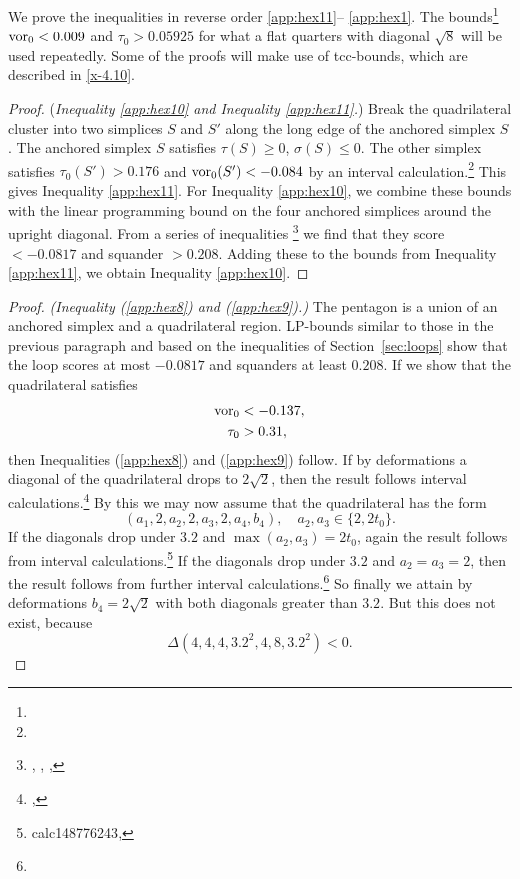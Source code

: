  We prove the inequalities in reverse order \ref{app:hex11}--
\ref{app:hex1}. The bounds\footnote{} %
   $\operatorname{vor}_0<0.009$ and $\tau_0>0.05925$
for what a flat quarters with diagonal $\sqrt8$  will be used
repeatedly.  Some of the proofs will make use of tcc-bounds, which
are described in \ref{x-4.10}.

\begin{proof}
({\it Inequality \ref{app:hex10} and Inequality \ref{app:hex11}.})
Break the quadrilateral cluster into two simplices $S$ and $S'$
along the long edge of the anchored simplex $S$.  The anchored
simplex $S$ satisfies $\tau(S)\ge0$, $\sigma(S)\le0$.  The other
simplex satisfies $\tau_0(S')>0.176$ and $\operatorname{vor}_0(S')<-0.084$ by an
interval calculation.\footnote{} %
  This gives Inequality \ref{app:hex11}.  For Inequality
\ref{app:hex10}, we combine these bounds with the linear
programming bound on the four anchored simplices around the
upright diagonal.  From a series of
inequalities%
\footnote{, , ,
}
we find that they score $<-0.0817$ and squander $>0.208$.  Adding
these to the bounds from Inequality \ref{app:hex11}, we obtain
Inequality \ref{app:hex10}.
\end{proof}

\begin{proof}
{\it (Inequality (\ref{app:hex8}) and (\ref{app:hex9}).)} The
pentagon is a union of an anchored simplex and a quadrilateral
region. LP-bounds similar to those in the previous paragraph and
based on the inequalities of Section~\ref{sec:loops} show that the
loop scores at most $-0.0817$ and squanders at least $0.208$.  If we
show that the quadrilateral satisfies
    \begin{eqnarray}
    \operatorname{vor}_0&<-0.137,\label{eqn:hexquadsig}\\
    \tau_0&>0.31,\label{eqn:hexquadtau}
    \end{eqnarray}
then Inequalities (\ref{app:hex8}) and (\ref{app:hex9}) follow. If
by deformations a diagonal of the quadrilateral drops to
$2\sqrt2$, then the result follows
interval calculations.\footnote{,} %
 By this we may now assume that the
quadrilateral has the form
    $$(a_1,2,a_2,2,a_3,2,a_4,b_4),\quad a_2,a_3\in\{2,2t_0\}.$$
If the diagonals drop under $3.2$ and $\max(a_2,a_3)=2t_0$, again
the result follows from
 interval
calculations.\footnote{calc{148776243},} %
If the diagonals drop under $3.2$ and $a_2=a_3=2$, then the result
follows from further interval
calculations.\footnote{} %
So finally we attain by deformations $b_4=2\sqrt2$ with both
diagonals greater than $3.2$. But this does not exist, because
    $$\Delta(4,4,4,3.2^2,4,8,3.2^2)<0.$$
\end{proof}


